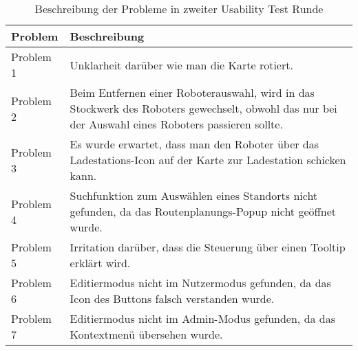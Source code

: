\begin{table}[H]
    \caption{Beschreibung der Probleme in zweiter Usability Test Runde}\label{tbl:2ndUsabilityTestsProblemsDesc}
    \begin{tabular}{|l|l|} \hline
        Problem     & Beschreibung \\ \hline
        Problem 1   & \multicolumn{1}{p{12cm}|}{Unklarheit darüber wie man die Karte rotiert.} \\ \hline
        Problem 2   & \multicolumn{1}{p{12cm}|}{Beim Entfernen einer Roboterauswahl, wird in das Stockwerk des Roboters gewechselt, obwohl das nur bei der Auswahl eines Roboters passieren sollte.} \\ \hline
        Problem 3   & \multicolumn{1}{p{12cm}|}{Es wurde erwartet, dass man den Roboter über das Ladestations-Icon auf der Karte zur Ladestation schicken kann.} \\ \hline
        Problem 4   & \multicolumn{1}{p{12cm}|}{Suchfunktion zum Auswählen eines Standorts nicht gefunden, da das Routenplanungs-Popup nicht geöffnet wurde.} \\ \hline
        Problem 5   & \multicolumn{1}{p{12cm}|}{Irritation darüber, dass die Steuerung über einen Tooltip erklärt wird.} \\ \hline
        Problem 6   & \multicolumn{1}{p{12cm}|}{Editiermodus nicht im Nutzermodus gefunden, da das Icon des Buttons falsch verstanden wurde.} \\ \hline
        Problem 7   & \multicolumn{1}{p{12cm}|}{Editiermodus nicht im Admin-Modus gefunden, da das Kontextmenü übersehen wurde.} \\ \hline
    \end{tabular}
\end{table}
